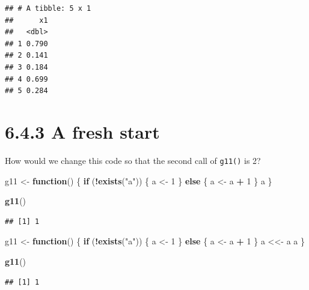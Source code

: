 \documentclass[]{book}
\newenvironment{Shaded}{\begin{snugshade}}{\end{snugshade}}
\newcommand{\ControlFlowTok}[1]{\textcolor[rgb]{0.13,0.29,0.53}{\textbf{#1}}}
\newcommand{\DecValTok}[1]{\textcolor[rgb]{0.00,0.00,0.81}{#1}}
\newcommand{\KeywordTok}[1]{\textcolor[rgb]{0.13,0.29,0.53}{\textbf{#1}}}
\newcommand{\NormalTok}[1]{#1}
\newcommand{\OperatorTok}[1]{\textcolor[rgb]{0.81,0.36,0.00}{\textbf{#1}}}
\newcommand{\StringTok}[1]{\textcolor[rgb]{0.31,0.60,0.02}{#1}}
\begin{document}
\begin{verbatim}
## # A tibble: 5 x 1
##      x1
##   <dbl>
## 1 0.790
## 2 0.141
## 3 0.184
## 4 0.699
## 5 0.284
\end{verbatim}

\hypertarget{a-fresh-start}{%
\section*{6.4.3 A fresh start}\label{a-fresh-start}}

How would we change this code so that the second call of \texttt{g11()} is 2?

\begin{Shaded}
\begin{Highlighting}[]
\NormalTok{g11 <-}\StringTok{ }\ControlFlowTok{function}\NormalTok{() \{}
  \ControlFlowTok{if}\NormalTok{ (}\OperatorTok{!}\KeywordTok{exists}\NormalTok{(}\StringTok{"a"}\NormalTok{)) \{}
\NormalTok{    a <-}\StringTok{ }\DecValTok{1}
\NormalTok{  \} }\ControlFlowTok{else}\NormalTok{ \{}
\NormalTok{    a <-}\StringTok{ }\NormalTok{a }\OperatorTok{+}\StringTok{ }\DecValTok{1}
\NormalTok{  \}}
\NormalTok{  a}
\NormalTok{\}}

\KeywordTok{g11}\NormalTok{()}
\end{Highlighting}
\end{Shaded}

\begin{verbatim}
## [1] 1
\end{verbatim}

\begin{Shaded}
\begin{Highlighting}[]
\NormalTok{g11 <-}\StringTok{ }\ControlFlowTok{function}\NormalTok{() \{}
  \ControlFlowTok{if}\NormalTok{ (}\OperatorTok{!}\KeywordTok{exists}\NormalTok{(}\StringTok{"a"}\NormalTok{)) \{}
\NormalTok{    a <-}\StringTok{ }\DecValTok{1}
\NormalTok{  \} }\ControlFlowTok{else}\NormalTok{ \{}
\NormalTok{    a <-}\StringTok{ }\NormalTok{a }\OperatorTok{+}\StringTok{ }\DecValTok{1}
\NormalTok{  \}}
\NormalTok{  a <<-}\StringTok{ }\NormalTok{a}
\NormalTok{  a}
\NormalTok{\}}

\KeywordTok{g11}\NormalTok{()}
\end{Highlighting}
\end{Shaded}

\begin{verbatim}
## [1] 1
\end{verbatim}
\end{document}
